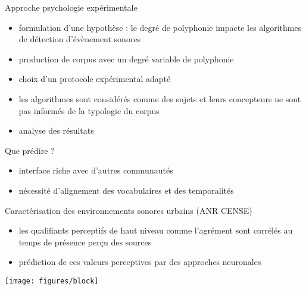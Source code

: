 \begin{frame}{Approche  \og psychologie expérimentale \fg}
\begin{itemize}
\item formulation d'une hypothèse : le degré de polyphonie impacte les algorithmes de détection d'évènement sonores
\item production de corpus avec un degré variable de polyphonie
\item choix d'un protocole expérimental adapté
\item les algorithmes sont considérés comme des sujets et leurs concepteurs ne sont pas informés de la typologie du corpus
\item analyse des résultats
\end{itemize} 
\end{frame}

\begin{frame}{Que prédire ?}
\begin{center}
\end{center}
\vspace{.8cm}
\begin{itemize}
\item interface riche avec d'autres communautés
\item nécessité d'alignement des vocabulaires et des temporalités
\end{itemize}
\end{frame}

\begin{frame}{Caractérisation des environnements sonores urbains (ANR CENSE)}
  \begin{minipage}{.5\columnwidth}
    \begin{itemize}
    \item les qualifiants perceptifs de haut niveau comme l'agrément sont corrélés au temps de présence perçu des sources
    \item prédiction de ces valeurs perceptives par des approches neuronales
    \end{itemize}
  \end{minipage}
  \begin{minipage}{.4\columnwidth}
    \begin{center}
    \texttt{[image: figures/block]} \\
    \end{center}
  \end{minipage}
\end{frame}

